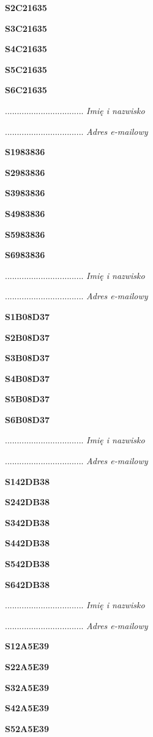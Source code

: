 \Large \textbf{S2C21635}

\Large \textbf{S3C21635}

\Large \textbf{S4C21635}

\Large \textbf{S5C21635}

\Large \textbf{S6C21635}

.................................
\textit{Imię i nazwisko}

.................................
\textit{Adres e-mailowy}

\Large \textbf{S1983836}

\Large \textbf{S2983836}

\Large \textbf{S3983836}

\Large \textbf{S4983836}

\Large \textbf{S5983836}

\Large \textbf{S6983836}

.................................
\textit{Imię i nazwisko}

.................................
\textit{Adres e-mailowy}

\Large \textbf{S1B08D37}

\Large \textbf{S2B08D37}

\Large \textbf{S3B08D37}

\Large \textbf{S4B08D37}

\Large \textbf{S5B08D37}

\Large \textbf{S6B08D37}

.................................
\textit{Imię i nazwisko}

.................................
\textit{Adres e-mailowy}

\Large \textbf{S142DB38}

\Large \textbf{S242DB38}

\Large \textbf{S342DB38}

\Large \textbf{S442DB38}

\Large \textbf{S542DB38}

\Large \textbf{S642DB38}

.................................
\textit{Imię i nazwisko}

.................................
\textit{Adres e-mailowy}

\Large \textbf{S12A5E39}

\Large \textbf{S22A5E39}

\Large \textbf{S32A5E39}

\Large \textbf{S42A5E39}

\Large \textbf{S52A5E39}

